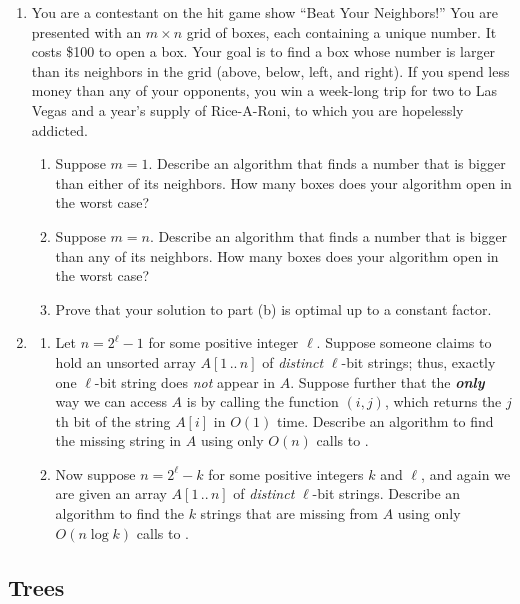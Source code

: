 \begin{exercises}
\begin{enumerate}[label=\arabic*.,ref=\thechapter.\arabic*,leftmargin=*,align=left,itemsep=1.5ex plus 0.5ex,resume]
\begin{enumerate}
Describe and analyze an algorithm to compute the number of rounds before Dr. Metaphor’s deadly process finally ends. For full credit, your algorithm should run in $O(n)$ time.
\end{enumerate}
\item You are a contestant on the hit game show “Beat Your Neighbors!” You are presented with an $m \times n$ grid of boxes, each containing a unique number. It costs \$100 to open a box. Your goal is to find a box whose number is larger than its neighbors in the grid (above, below, left, and right). If you spend less money than any of your opponents, you win a week-long trip for two to Las Vegas and a year’s supply of Rice-A-Roni\texttrademark, to which you are hopelessly addicted.
\begin{enumerate}
\item Suppose $m = 1$. Describe an algorithm that finds a number that is bigger than either of its neighbors. How many boxes does your algorithm open in the worst case?
\item {} Suppose $m = n$. Describe an algorithm that finds a number that is bigger than any of its neighbors. How many boxes does your algorithm open in the worst case?
\item {} Prove that your solution to part (b) is optimal up to a constant factor.
\end{enumerate}
\item
\begin{enumerate}
\item Let $n = 2^\ell - 1$ for some positive integer $\ell$. Suppose someone claims to hold an unsorted array $A[1\,..\,n]$ of \emph{distinct} $\ell$-bit strings; thus, exactly one $\ell$-bit string does \emph{not} appear in $A$. Suppose further that the \textbf{\textit{only}} way we can access $A$ is by calling the function $(i, j)$, which returns the $j$th bit of the string $A[i]$ in $O(1)$ time. Describe an algorithm to find the missing string in $A$ using only $O(n)$ calls to .
\item {} Now suppose $n = 2^\ell - k$ for some positive integers $k$ and $\ell$, and again we are given an array $A[1\,..\,n]$ of \emph{distinct} $\ell$-bit strings. Describe an algorithm to find the $k$ strings that are missing from $A$ using only $O(n \log k)$ calls to .
\end{enumerate}
\end{enumerate}

\subsection*{Trees}


\end{exercises}
